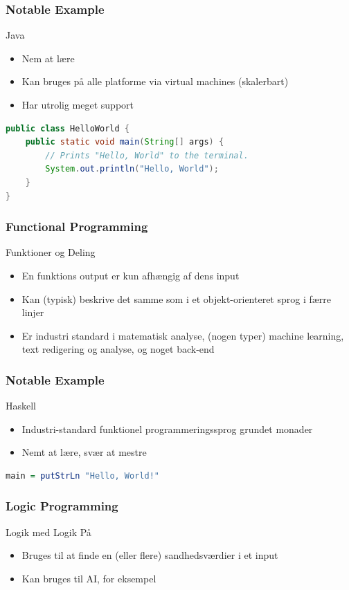 \documentclass[12pt,t]{beamer}
\begin{document}
\begin{frame}[fragile]
\frametitle{Notable Example}
\begin{block}{Java}
\begin{itemize}
\item Nem at lære
\item Kan bruges på alle platforme via virtual machines (skalerbart)
\item Har utrolig meget support
\end{itemize}
\end{block}
\begin{lstlisting}[language=Java]
public class HelloWorld {
    public static void main(String[] args) {
        // Prints "Hello, World" to the terminal.
        System.out.println("Hello, World");
    }
}

\end{lstlisting}
\end{frame}

\begin{frame}
\frametitle{Functional Programming}
\begin{block}{Funktioner og Deling}
\begin{itemize}
\item En funktions output er kun afhængig af dens input
\item Kan (typisk) beskrive det samme som i et objekt-orienteret sprog i 
færre linjer
\item Er industri standard i matematisk analyse, (nogen typer) machine learning, 
text redigering og analyse, og noget back-end
\end{itemize}
\end{block}
\end{frame}

\begin{frame}[fragile]
\frametitle{Notable Example}
\begin{block}{Haskell}
\begin{itemize}
\item Industri-standard funktionel programmeringssprog grundet monader
\item Nemt at lære, svær at mestre
\end{itemize}
\end{block}
\begin{lstlisting}[language=Haskell]
main = putStrLn "Hello, World!"
\end{lstlisting}
\end{frame}

\begin{frame}
\frametitle{Logic Programming}
\begin{block}{Logik med Logik På}
\begin{itemize}
\item Bruges til at finde en (eller flere) sandhedsværdier i et input
\item Kan bruges til AI, for eksempel
\end{itemize}
\end{block}
\end{frame}
\end{document}
